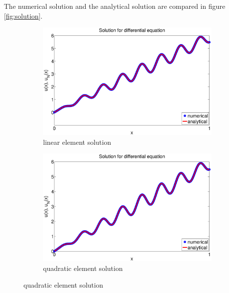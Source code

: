 \documentclass[paper=a4, fontsize=11pt]{article} %
\begin{document}
The numerical solution and the analytical solution are compared in figure \ref{fig:solution}. 


\begin{figure}
        \centering
        \begin{subfigure}[b]{\textwidth}
                \includegraphics[width=\textwidth]{solution_P1.eps}
                \caption{linear element solution}
                \label{fig:k2}
        \end{subfigure}%
        
        \begin{subfigure}[b]{\textwidth}
                \includegraphics[width=\textwidth]{solution_P2.eps}
                \caption{quadratic element solution}
                \label{fig:k4}
        \end{subfigure}
        

\end{figure}
\end{document}
